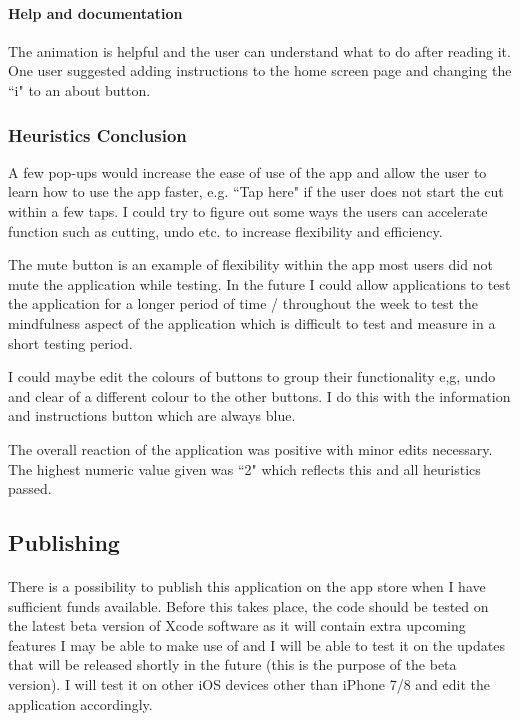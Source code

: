 \documentclass[11pt]{article}
\begin{document}
                \paragraph{Help and documentation} 
                The animation is helpful and the user can understand what to do after reading it. One user suggested adding instructions to the home screen page and changing the ``i" to an about button.
                
                \subsubsection{Heuristics Conclusion}
                A few pop-ups would increase the ease of use of the app and allow the user to learn how to use the app faster, e.g. ``Tap here" if the user does not start the cut within a few taps. I could try to figure out some ways the users can accelerate function such as cutting, undo etc. to increase flexibility and efficiency. 
                
                The mute button is an example of flexibility within the app most users did not mute the application while testing. In the future I could allow applications to test the application for a longer period of time / throughout the week to test the mindfulness aspect of the application which is difficult to test and measure in a short testing period. 
                
                 I could maybe edit the colours of buttons to group their functionality e,g, undo and clear of a different colour to the other buttons. I do this with the information and instructions button which are always blue. 
                
                The overall reaction of the application was positive with minor edits necessary. The highest numeric value given was ``2" which reflects this and all heuristics passed. 
                
        

    \subsection{Publishing}
        \paragraph{}
        There is a possibility to publish this application on the app store when I have sufficient funds available. Before this takes place, the code should be tested on the latest beta version of Xcode software as it will contain extra upcoming features I may be able to make use of and I will be able to test it on the updates that will be released shortly in the future (this is the purpose of the beta version). I will test it on other iOS devices other than iPhone 7/8 and edit the application accordingly.
        
\end{document}

